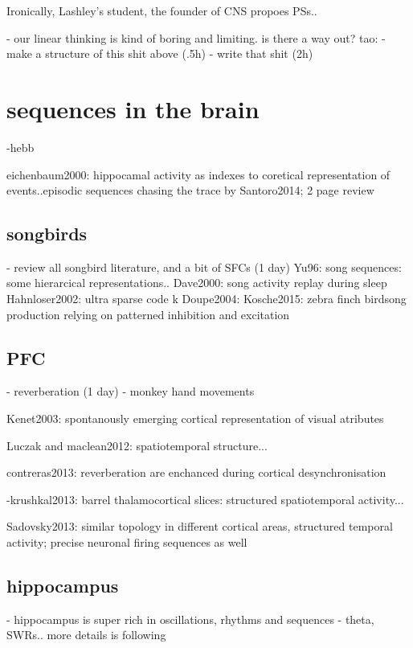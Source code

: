     Ironically, Lashley's student, the founder of CNS propoes PSs..


  - our linear thinking is kind of boring and limiting. is there a way out?
  tao:
    - make a structure of this shit above (.5h)
    - write that shit (2h)

\section{sequences in the brain}

  -hebb

  eichenbaum2000: hippocamal activity as indexes to coretical representation of events..episodic sequences
  chasing the trace by Santoro2014; 2 page review

  \subsection{songbirds}
    - review all songbird literature, and a bit of SFCs (1 day)
    Yu96: song sequences: some hierarcical representations..
    Dave2000: song activity replay during sleep
    Hahnloser2002: ultra sparse code k
    Doupe2004: 
    Kosche2015: zebra finch birdsong production relying on patterned inhibition and excitation 
  \subsection{PFC}
    - reverberation (1 day)
    - monkey hand movements

    Kenet2003: spontanously emerging cortical representation of visual atributes
    
    Luczak and maclean2012: spatiotemporal structure...



    contreras2013: reverberation are enchanced during cortical desynchronisation


    -krushkal2013: barrel thalamocortical slices: structured spatiotemporal activity...

    Sadovsky2013: similar topology in different cortical areas, structured temporal activity; precise neuronal firing sequences as well

  \subsection{hippocampus}
    - hippocampus is super rich in oscillations, rhythms and sequences
    - theta, SWRs.. more details is following



